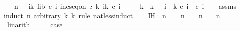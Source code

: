 \begin{isabellebody}
\ \ \ {\isachardoublequoteopen}n\ {\isacharequal}{\kern0pt}\ {\isacharparenleft}{\kern0pt}{\isasymSum}\ i{\isacharequal}{\kern0pt}{}{\isachardot}{\kern0pt}{\isachardot}{\kern0pt}k{\isacharprime}{\kern0pt}{\isachardot}{\kern0pt}\ fib\ {\isacharparenleft}{\kern0pt}c{\isacharprime}{\kern0pt}\ i{\isacharparenright}{\kern0pt}{\isacharparenright}{\kern0pt}{\isachardoublequoteclose}\ {\isachardoublequoteopen}inc{\isacharunderscore}{\kern0pt}seq{\isacharunderscore}{\kern0pt}on\ c{\isacharprime}{\kern0pt}\ {\isacharbraceleft}{\kern0pt}{}{\isachardot}{\kern0pt}{\isachardot}{\kern0pt}k{\isacharprime}{\kern0pt}{\isacharminus}{\kern0pt}{}{\isacharbraceright}{\kern0pt}{\isachardoublequoteclose}\ {\isachardoublequoteopen}{\isasymforall}i{\isasymin}{\isacharbraceleft}{\kern0pt}{}{\isachardot}{\kern0pt}{\isachardot}{\kern0pt}k{\isacharprime}{\kern0pt}{\isacharbraceright}{\kern0pt}{\isachardot}{\kern0pt}\ c{\isacharprime}{\kern0pt}\ i\ {\isasymge}\ {}{\isachardoublequoteclose}\isanewline
\ \ \ {\isachardoublequoteopen}k\ {\isacharequal}{\kern0pt}\ k{\isacharprime}{\kern0pt}\ {\isasymand}\ {\isacharparenleft}{\kern0pt}{\isasymforall}\ i\ {\isasymin}\ {\isacharbraceleft}{\kern0pt}{}{\isachardot}{\kern0pt}{\isachardot}{\kern0pt}k{\isacharbraceright}{\kern0pt}{\isachardot}{\kern0pt}\ c\ i\ {\isacharequal}{\kern0pt}\ c{\isacharprime}{\kern0pt}\ i{\isacharparenright}{\kern0pt}{\isachardoublequoteclose}\isanewline
%
\isadelimproof
\ \ %
\endisadelimproof
%
\isatagproof
{}\isamarkupfalse%
\ assms\isanewline
{}\isamarkupfalse%
{\isacharparenleft}{\kern0pt}induct\ n\ arbitrary{\isacharcolon}{\kern0pt}\ k\ k{\isacharprime}{\kern0pt}\ rule{\isacharcolon}{\kern0pt}\ nat{\isacharunderscore}{\kern0pt}less{\isacharunderscore}{\kern0pt}induct{\isacharparenright}{\kern0pt}\isanewline
\ \ \isamarkupfalse%
\ IH{\isacharcolon}{\kern0pt}\ {\isacharparenleft}{\kern0pt}{}\ n{\isacharparenright}{\kern0pt}\isanewline
\ \ \isamarkupfalse%
\ {\isachardoublequoteopen}n\ {\isacharequal}{\kern0pt}\ {}{\isachardoublequoteclose}\ {\isacharbar}{\kern0pt}\ {\isachardoublequoteopen}n\ {\isacharequal}{\kern0pt}\ {}{\isachardoublequoteclose}\ {\isacharbar}{\kern0pt}\ {\isachardoublequoteopen}n\ {\isasymge}\ {}{\isachardoublequoteclose}\ \isamarkupfalse%
\ linarith\isanewline
\ \ \isamarkupfalse%
\ \isamarkupfalse%
\ {\isacharquery}{\kern0pt}case\isanewline

\end{isabellebody}
